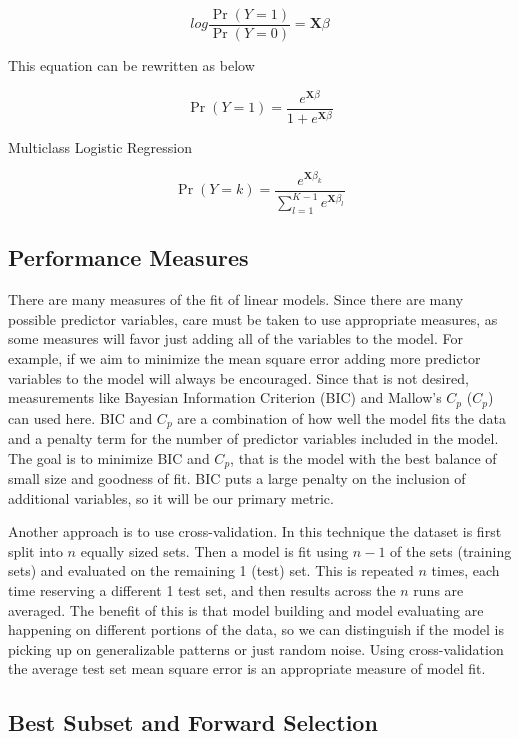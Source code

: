 \documentclass{article}
\newcommand{\bX}{\mathbf{X}}
\begin{document}
\[log \frac{\Pr(Y = 1)}{\Pr(Y = 0)} = \bX\beta \]

This equation can be rewritten as below

\[ \Pr(Y = 1) = \frac{e^{\bX\beta}}{1 + e^{\bX\beta}} \]

Multiclass Logistic Regression

\[ \Pr(Y = k) = \frac{e^{\bX\beta_k}}{\sum_{l=1}^{K-1} e^{\bX\beta_l}} \]


\subsection{Performance Measures}

There are many measures of the fit of linear models. Since there are many possible predictor variables, care must be taken 
to use appropriate measures, as some measures will favor just adding all of the variables to the model. For example, if we 
aim to minimize the mean square error adding more predictor variables to the model will always be encouraged. Since that is not desired, measurements like Bayesian Information Criterion (BIC) and Mallow's $C_p$ ($C_p$) can used here. BIC and $C_p$ are a combination of how well the model fits the data and a penalty term for the number of predictor variables included in the model. The goal is to minimize BIC and $C_p$, that is the model with the best balance of small size and goodness of fit. BIC puts a large penalty on the inclusion of additional variables, so it will be our primary metric.

Another approach is to use cross-validation. In this technique the dataset is first split into $n$ equally sized sets. Then a 
model is fit using $n - 1$ of the sets (training sets) and evaluated on the remaining 1 (test) set. This is repeated $n$ times, 
each time reserving a different 1 test set, and then results across the $n$ runs are averaged. The benefit of this is that model 
building and model evaluating are happening on different portions of the data, so we can distinguish if the model is picking up 
on generalizable patterns or just random noise. Using cross-validation the average test set mean square error is an 
appropriate measure of model fit.

\subsection{Best Subset and Forward Selection}
\end{document}
